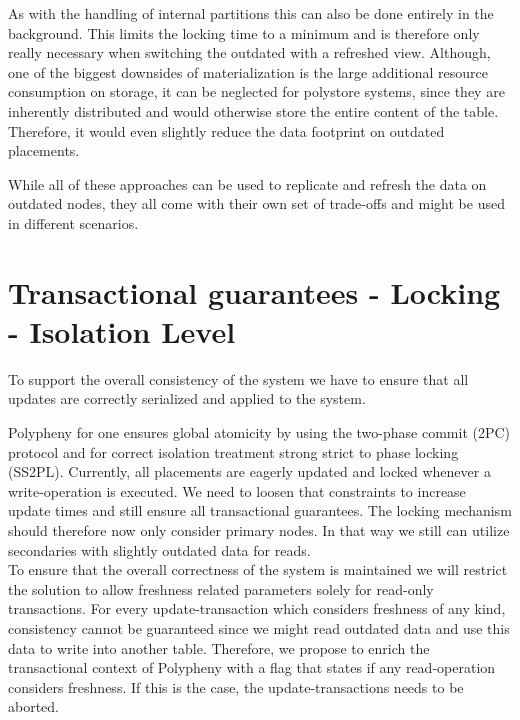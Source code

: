 \begin{description}
As with the handling of internal partitions this can also be done entirely in the background. This limits the locking time to a minimum and is therefore only really 
necessary when switching the outdated with a refreshed view.
Although, one of the biggest downsides of materialization is the large additional resource consumption on storage, it can be neglected for polystore systems, since they are
inherently distributed and would otherwise store the entire content of the table. Therefore, it would even slightly reduce the data footprint on outdated placements.

\end{description}


While all of these approaches can be used to replicate and refresh the data on outdated nodes, they all come with their own set of trade-offs and might be used in different scenarios. 






\section{Transactional guarantees - Locking - Isolation Level}
\label{consistency}

To support the overall consistency of the system we have to ensure that all updates are correctly serialized and applied to the system.

Polypheny for one ensures global atomicity by using the two-phase commit (2PC) protocol and for correct isolation treatment
strong strict to phase locking (SS2PL). Currently, all placements are eagerly updated and locked whenever a write-operation is executed.
We need to loosen that constraints to increase update times and still ensure all transactional guarantees. The locking mechanism should therefore 
now only consider primary nodes. In that way we still can utilize secondaries with slightly outdated data for reads.\\

To ensure that the overall correctness of the system is maintained we will restrict the solution to allow freshness related parameters solely
for read-only transactions. For every update-transaction which considers freshness of any kind, consistency cannot be guaranteed since we might read outdated data
and use this data to write into another table. Therefore, we propose to enrich  the transactional context of Polypheny with a flag that states if any read-operation 
considers freshness. If this is the case, the update-transactions needs to be aborted.\\


